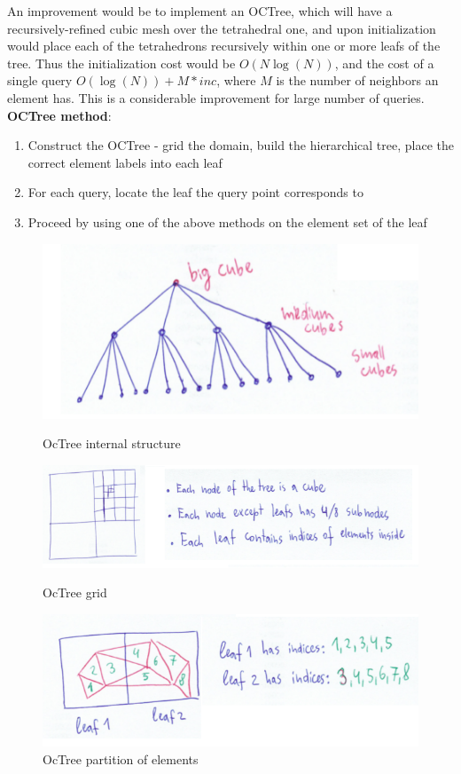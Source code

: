 \noindent
An improvement would be to implement an OCTree, which will have a recursively-refined cubic mesh over the tetrahedral one, and upon initialization would place each of the tetrahedrons recursively within one or more leafs of the tree. Thus the initialization cost would be $O(N \log(N))$, and the cost of a single query $O(\log(N)) + M * inc$, where $M$ is the number of neighbors an element has. This is a considerable improvement for large number of queries. \\

\noindent
\textbf{OCTree method}:
\begin{enumerate}
	\item Construct the OCTree - grid the domain, build the hierarchical tree, place the correct element labels into each leaf
	\item For each query, locate the leaf the query point corresponds to
	\item Proceed by using one of the above methods on the element set of the leaf
\end{enumerate}

\begin{figure}[hp]
    \centering
    \includegraphics[scale=0.7]{doc-pics/pic-octree-3.png}
	\caption{OcTree internal structure}    
    
    \includegraphics[scale=0.7]{doc-pics/pic-octree-1.png}
	\caption{OcTree grid}    
	
    \includegraphics[scale=0.7]{doc-pics/pic-octree-2.png}
	\caption{OcTree partition of elements}    
\end{figure}


